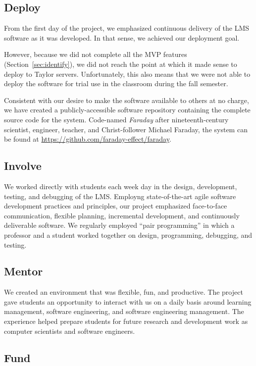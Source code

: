 \documentclass{article}
\begin{document}
\subsection{Deploy}

From the first day of the project,
we emphasized continuous delivery
of the LMS software as it was developed.
In that sense,
we achieved our deployment goal.

However,
because we did not complete all the MVP features
(Section~\ref{sec:identify}),
we did not reach the point at which
it made sense to deploy to Taylor servers.
Unfortunately,
this also means that we were not able to
deploy the software for trial use in the classroom
during the fall semester.

Consistent with our desire to make the software
available to others at no charge,
we have created a publicly-accessible software repository
containing the complete source code
for the system.
Code-named \emph{Faraday} after nineteenth-century
scientist, engineer, teacher, and Christ-follower Michael Faraday,
the system can be found at \url{https://github.com/faraday-effect/faraday}.

\subsection{Involve}

We worked directly with students
each week day
in the design, development, testing, and debugging
of the LMS.
Employng state-of-the-art
agile software development
practices and principles,
our project emphasized
face-to-face communication,
flexible planning,
incremental development,
and continuously deliverable software.
We regularly employed ``pair programming''
in which a professor and a student
worked together on design, programming,
debugging, and testing.

\subsection{Mentor}

We created an environment that was
flexible, fun, and productive.
The project gave students an opportunity to interact
with us on a daily basis around
learning management,
software engineering,
and software engineering management.
The experience
helped prepare students
for future research and development work
as computer scientists and software engineers.

\subsection{Fund}
\end{document}
